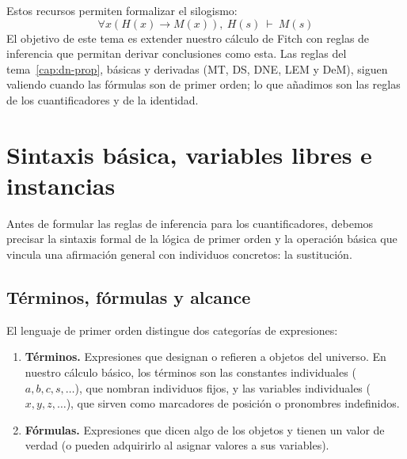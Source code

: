 Estos recursos permiten formalizar el silogismo: 
\[
\forall x (H(x) \to M(x)), \ H(s) \ \vdash \ M(s)
\]
El objetivo de este tema es extender nuestro cálculo de Fitch con reglas de inferencia que permitan derivar conclusiones como esta. Las reglas del tema~\ref{cap:dn-prop}, básicas y derivadas (MT, DS, DNE, LEM y DeM), siguen valiendo cuando las fórmulas son de primer orden; lo que añadimos son las reglas de los cuantificadores y de la identidad.

\section{Sintaxis básica, variables libres e instancias}\label{sec:sintaxis-lpo}

Antes de formular las reglas de inferencia para los cuantificadores, debemos precisar la sintaxis formal de la lógica de primer orden y la operación básica que vincula una afirmación general con individuos concretos: la sustitución.

\subsection{Términos, fórmulas y alcance}

El lenguaje de primer orden distingue dos categorías de expresiones:
\begin{enumerate}
    \item \textbf{Términos.} Expresiones que designan o refieren a objetos del universo. En nuestro cálculo básico, los términos son las constantes individuales ($a, b, c, s, \dots$), que nombran individuos fijos, y las variables individuales ($x, y, z, \dots$), que sirven como marcadores de posición o pronombres indefinidos.
    \item \textbf{Fórmulas.} Expresiones que dicen algo de los objetos y tienen un valor de verdad (o pueden adquirirlo al asignar valores a sus variables).
\end{enumerate}

